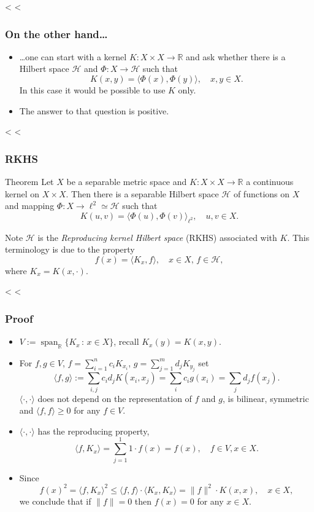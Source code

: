 \documentclass{beamer}
\DeclareMathOperator{\spn}{\mathrm{span}}
\begin{document}
<%
<%
\begin{frame}[c]\frametitle{On the other hand\ldots}
	\begin{itemize}
		\item \ldots one can start with a kernel $K: X \times X \to \mathbb{R}$ and ask whether there is a Hilbert space $\mathscr{H}$ and $\Phi: X \to \mathscr{H}$ such that
		\[
			K(x,y) = \langle \Phi(x), \Phi(y) \rangle, \quad x,y \in X.
		\]
		In this case it would be possible to use $K$ only.
		\vfill
		\item The answer to that question is positive.
	\end{itemize}
\end{frame}

<%
<%
\begin{frame}[c]\frametitle{RKHS}
	\begin{block}{Theorem}
		Let $X$ be a separable metric space and $K: X \times X \to \mathbb{R}$ a continuous kernel on $X \times X$. Then there is a separable Hilbert space $\mathscr{H}$ of functions on $X$ and mapping $\Phi: X \to \ell^2 \simeq \mathscr{H}$ such that
		\[
			K(u,v) = \langle \Phi(u), \Phi(v) \rangle_{\ell^2}, \quad u,v\in X.
		\]
	\end{block}
	\vfill
	\begin{block}{Note}
		$\mathscr{H}$ is the \emph{Reproducing kernel Hilbert space} (RKHS) associated with $K$. This terminology is due to the property
		\[
			f(x) = \langle K_x, f \rangle, \quad x\in X, \, f\in \mathscr{H},
		\]
		where $K_x = K(x,\cdot)$.
	\end{block}
\end{frame}

<%
<%
\begin{frame}[t]\frametitle{Proof}
	\begin{itemize}
		\item $V := \spn_\mathbb{R} \{ K_x \,:\, x\in X \}$, recall $K_x(y) = K(x,y)$.
		\pause
		\item For $f,g \in V$, $f = \sum_{i=1}^n c_i K_{x_i}$, $g = \sum_{j=1}^m d_j K_{y_j}$ set
			\[
				\langle f,g \rangle := \sum_{i,j} c_i d_j K(x_i,x_j) = \sum_i c_i g(x_i) = \sum_j d_j f(x_j).
			\]
			$\langle\cdot,\cdot\rangle$ does not depend on the representation of $f$ and $g$, is bilinear, symmetric and $\langle f,f \rangle \geq 0$ for any $f\in V$.
		\pause
		\item $\langle\cdot,\cdot\rangle$ has the reproducing property,
			\[
				\langle f,K_x \rangle = \sum_{j=1}^1 1\cdot f(x) = f(x), \quad f\in V, x\in X.
			\]
		\pause
		\item
			Since
			\[
				f(x)^2 = \langle f, K_x \rangle^2 \leq \langle f,f \rangle \cdot \langle K_x, K_x \rangle = \|f\|^2 \cdot K(x,x), \quad x\in X,
			\]
			we conclude that if $\|f\| = 0$ then $f(x) = 0$ for any $x\in X$.
	\end{itemize}
\end{frame}
\end{document}
